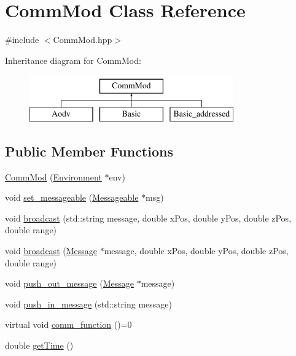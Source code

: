 \hypertarget{class_comm_mod}{}\section{Comm\+Mod Class Reference}
\label{class_comm_mod}


{\ttfamily \#include $<$Comm\+Mod.\+hpp$>$}

Inheritance diagram for Comm\+Mod\+:\begin{figure}[H]
\begin{center}
\leavevmode
\includegraphics[height=2.000000cm]{class_comm_mod}
\end{center}
\end{figure}
\subsection*{Public Member Functions}
\begin{DoxyCompactItemize}
\item 
\hyperlink{class_comm_mod_a00ab1077257c3672f8036468aecbf234}{Comm\+Mod} (\hyperlink{class_environment}{Environment} $\ast$env)
\item 
void \hyperlink{class_comm_mod_ab2e096b71516134bc0cb9bae4a965ef7}{set\+\_\+messageable} (\hyperlink{class_messageable}{Messageable} $\ast$msg)
\item 
void \hyperlink{class_comm_mod_abcfe15ea4ed5b27d77d2613cc4e786a3}{broadcast} (std\+::string message, double x\+Pos, double y\+Pos, double z\+Pos, double range)
\item 
void \hyperlink{class_comm_mod_af3e34b66c07a5c1e35a806443d0bca8c}{broadcast} (\hyperlink{class_message}{Message} $\ast$message, double x\+Pos, double y\+Pos, double z\+Pos, double range)
\item 
void \hyperlink{class_comm_mod_a696711acc752f9c2c60865194de3287f}{push\+\_\+out\+\_\+message} (\hyperlink{class_message}{Message} $\ast$message)
\item 
void \hyperlink{class_comm_mod_a2acc6cb30eb7c9d55e3893da147db839}{push\+\_\+in\+\_\+message} (std\+::string message)
\item 
virtual void \hyperlink{class_comm_mod_a48b1d970ce600043bf2b610ae113e825}{comm\+\_\+function} ()=0
\item 
double \hyperlink{class_comm_mod_a7415ee1b2835f8cb0d650df6ed80622a}{get\+Time} ()
\end{DoxyCompactItemize}
